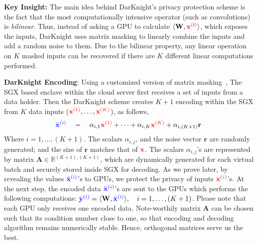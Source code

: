  \textbf{Key Insight:} The main idea behind DarKnight's privacy protection scheme is the fact that the most computationally intensive operator (such as convolutions) is \emph{bilinear}. Thus, instead of asking a GPU to calculate $\langle \mathbf W,\mathbf {\color{red} x^{(i)}}\rangle$, which exposes the inputs, DarKnight uses matrix masking to linearly combine the inputs and add a random noise to them. Due to the bilinear property, any linear operation on $K$ masked inputs can be recovered if there are $K$ different linear computations performed.
 



\textbf{DarKnight Encoding}: Using a customized version of matrix masking~\citep{cox1980suppression, cox1994matrix, kim1986method, spruill1983confidentiality,yu2019lagrange}, The SGX based enclave within the cloud server first receives a set of inputs from a data holder. Then the DarKnight scheme creates $K+1$ encoding within the SGX from $K$ data inputs (${\color{red}{\mathbf x}^{(1)}},\dots,{\color{red}{\mathbf x}^{(K)}}$), as follows,
\begin{align}\label{eq:inference_blinding}
{\color{blue}\bar{\mathbf x}^{(i)}}\quad= \quad \alpha_{i,1} {\color{red}\mathbf{x}^{(1)}} + \dots+ \alpha_{i,K} {\color{red}\mathbf{x}^{(K)}}  +\alpha_{i,(K+1)} \mathbf{r}~
\end{align}
Where $i=1,\dots,(K+1)$. The scalars $\alpha_{i,j}$, and the noise vector $\mathbf r$ are randomly generated; and the size of $\mathbf r$ matches that of ${\color{red}\mathbf x}$.
The scalars $\alpha_{i,j}$'s are represented by matrix $\mathbf A \in \mathbb R^{(K+1),(K+1)}$, which are dynamically generated for each virtual batch and securely stored inside SGX for decoding. As we prove later, by revealing the values ${\color{blue}\bar{\mathbf x}^{(i)}}$'s to GPUs, we protect the privacy of inputs ${\color{red}\mathbf x^{(i)}}$'s. At the next step, the encoded data ${\color{blue}\bar{\mathbf x}^{(i)}}$'s are sent to the GPUs which performs the following computations:
${\color{blue}\bar{\mathbf y}^{(i)}} =\langle \mathbf W , {\color{blue}\bar{\mathbf x}^{(i)}}\rangle, \quad i=1,\dots,(K+1)$.
Please note that each GPU only receives one encoded data. Note-worthily matrix $\mathbf A$ can be chosen such that its condition number close to one, so that encoding and decoding algorithm remains numerically stable. Hence, orthogonal matrices serve us the best.

